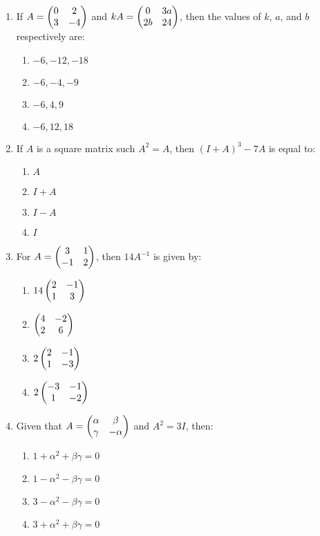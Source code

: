 \documentclass{article}
\begin{document}
\begin{enumerate}
    \item If $A = \begin{pmatrix}0 & 2 \\ 3 & -4\end{pmatrix}$ and $kA = \begin{pmatrix}0 & 3a \\ 2b & 24\end{pmatrix}$, then the values of $k$, $a$, and $b$ respectively are:
    \begin{enumerate}
        \item $-6, -12, -18$
        \item $-6, -4, -9$
        \item $-6, 4, 9$
        \item $-6, 12, 18$
    \end{enumerate}

    \item If $A$ is a square matrix such $A^2 = A$, then $(I + A)^3 - 7A$ is equal to:
    \begin{enumerate}
        \item $A$
        \item $I + A$
        \item $I - A$
        \item $I$ 
    \end{enumerate}

    \item For $A = \begin{pmatrix}3 & 1 \\ -1 & 2\end{pmatrix}$, then $14A^{-1}$ is given by:
    \begin{enumerate}
        \item $14 \begin{pmatrix}2 & -1 \\ 1 & 3\end{pmatrix}$
        \item $\begin{pmatrix}4 & -2 \\ 2 & 6\end{pmatrix}$
        \item $2\begin{pmatrix}2 & -1 \\ 1 & -3\end{pmatrix}$
        \item $2\begin{pmatrix}-3 & -1 \\ 1 & -2 \end{pmatrix}$
    \end{enumerate}

    \item Given that $A = \begin{pmatrix}\alpha & \beta \\ \gamma & -\alpha\end{pmatrix}$ and $A^2 = 3I$, then:
    \begin{enumerate}
        \item $1 + \alpha^2 + \beta\gamma = 0$
        \item $1 - \alpha^2 - \beta\gamma = 0$
        \item $3 - \alpha^2 - \beta\gamma = 0$
        \item $3 + \alpha^2 + \beta\gamma = 0$
    \end{enumerate}


\end{enumerate}
\end{document}
